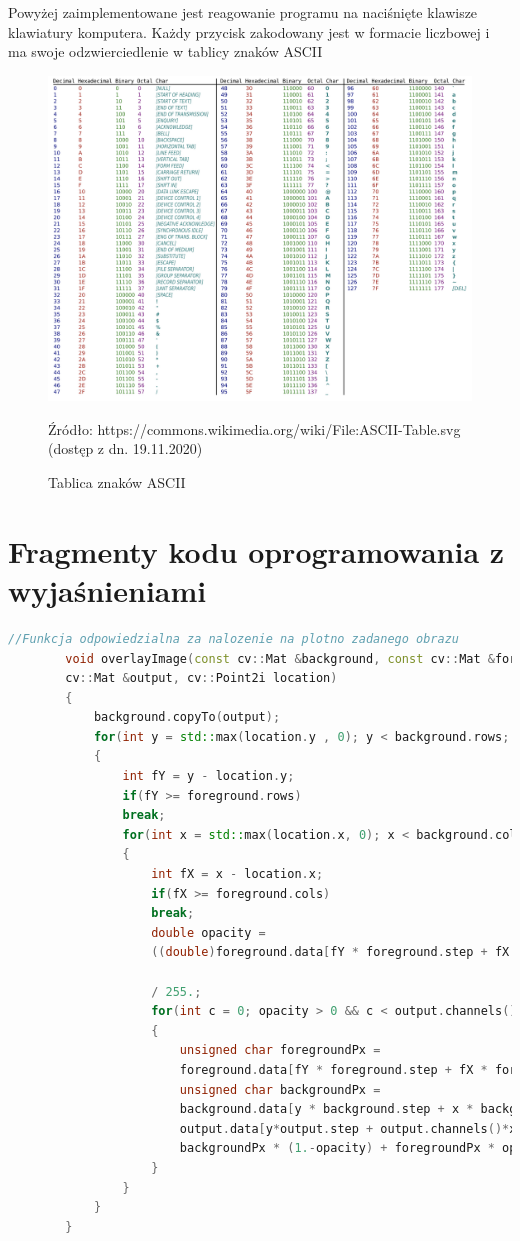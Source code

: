 \documentclass{article}
\begin{document}
	\newpage
	
	Powyżej zaimplementowane jest reagowanie programu na naciśnięte klawisze klawiatury komputera. Każdy przycisk zakodowany jest w formacie liczbowej i ma swoje odzwierciedlenie w tablicy znaków ASCII
	
	\begin{figure}
		\centering
		\includegraphics[width=15cm]{ascii}
		\caption{Tablica znaków ASCII}
		Źródło: https://commons.wikimedia.org/wiki/File:ASCII-Table.svg (dostęp z dn. 19.11.2020)
	\end{figure}
	
	\newpage
	
	\section*{\textbf{Fragmenty kodu oprogramowania z wyjaśnieniami} }
	
	\begin{lstlisting}[language=C++, caption=Nakładanie obrazu do kolorowania. Źródło: Własne]
		//Funkcja odpowiedzialna za nalozenie na plotno zadanego obrazu
		void overlayImage(const cv::Mat &background, const cv::Mat &foreground, 
		cv::Mat &output, cv::Point2i location)
		{
			background.copyTo(output);
			for(int y = std::max(location.y , 0); y < background.rows; ++y)
			{
				int fY = y - location.y;
				if(fY >= foreground.rows)
				break;
				for(int x = std::max(location.x, 0); x < background.cols; ++x)
				{
					int fX = x - location.x;
					if(fX >= foreground.cols)
					break;
					double opacity =
					((double)foreground.data[fY * foreground.step + fX * foreground.channels() + 3])
					
					/ 255.;
					for(int c = 0; opacity > 0 && c < output.channels(); ++c)
					{
						unsigned char foregroundPx =
						foreground.data[fY * foreground.step + fX * foreground.channels() + c];
						unsigned char backgroundPx =
						background.data[y * background.step + x * background.channels() + c];
						output.data[y*output.step + output.channels()*x + c] =
						backgroundPx * (1.-opacity) + foregroundPx * opacity;
					}
				}
			}
		}
	\end{lstlisting}
	
\end{document}
